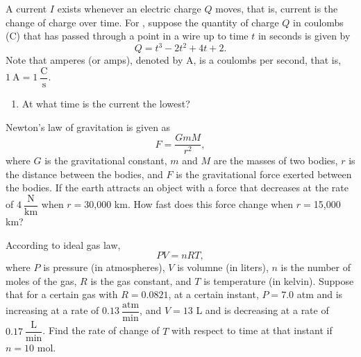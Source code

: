 \documentclass{book}
\begin{document}
A current $I$ exists whenever an electric charge $Q$ moves, that is, current is the change of charge over time. For , suppose the quantity of charge $Q$ in coulombs (C) that has passed through a point in a wire up to time $t$ in seconds is given by
\[Q = t^3-2t^2+4t+2.\] Note that amperes (or amps), denoted by A, is a coulombs per second, that is, $1\ \text{A} = 1\ \dfrac{\text{C}}{\text{s}}$. 
\begin{enumerate}[!HW!, label=$\spadesuit$ \arabic*., ref=\arabic*]
\item%
\label{exer:coulombs:stop} At what time is the current the lowest?\\ 
\end{enumerate}

\begin{enumerate}[!HW!]
\itemspade Newton's law of gravitation is given as 
\[F=\dfrac{GmM}{r^2},\] where $G$ is the gravitational constant, $m$ and $M$ are the masses of two bodies, $r$ is the distance between the bodies, and $F$ is the gravitational force exerted between the bodies. If the earth attracts an object with a force that decreases at the rate of $4\ \dfrac{\text{N}}{\text{km}}$ when $r = $30,000 km. How fast does this force change when $r = $15,000 km?

\itemspade According to ideal gas law,  \[PV = nRT,\] where $P$ is pressure (in atmospheres),  $V$ is volumne (in liters), $n$ is the number of moles of the gas, $R$ is the gas constant, and $T$ is temperature (in kelvin). Suppose that for a certain gas with $R = 0.0821$, at a certain instant, $P = 7.0$ atm and is increasing at a rate of $0.13\ \dfrac{\text{atm}}{\text{min}}$, and $V = 13$ L and is decreasing at a rate of
$0.17\ \dfrac{\text{L}}{\text{min}}$. Find the rate of change of $T$ with respect to time at that instant if $n = 10$ mol.\\
\end{enumerate}
\end{document}
